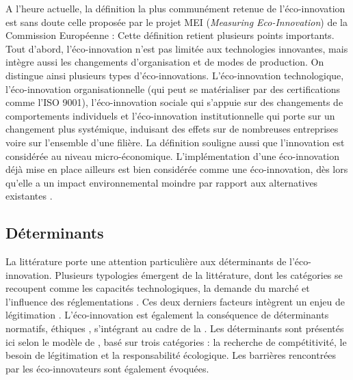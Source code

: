     A l'heure actuelle, la définition la plus communément retenue de l'éco-innovation est sans doute celle proposée par le projet MEI (\textit{Measuring Eco-Innovation}) de la Commission Européenne : \textit{} Cette définition retient plusieurs points importants. Tout d'abord, l'éco-innovation n'est pas limitée aux technologies innovantes, mais intègre aussi les changements d'organisation et de modes de production. On distingue ainsi plusieurs types d'éco-innovations. L'éco-innovation technologique, l'éco-innovation organisationnelle (qui peut se matérialiser par des certifications comme l'ISO 9001), l'éco-innovation sociale qui s'appuie sur des changements de comportements individuels et l'éco-innovation institutionnelle qui porte sur un changement plus systémique, induisant des effets sur de nombreuses entreprises voire sur l'ensemble d'une filière.  La définition souligne aussi que l'innovation est considérée au niveau micro-économique. L'implémentation d'une éco-innovation déjà mise en place ailleurs est bien considérée comme une éco-innovation, dès lors qu'elle a un impact environnemental moindre par rapport aux alternatives existantes \parencite{arundel2009measuring, kemp2010eco-innovation:}.


    \subsection{Déterminants}

        La littérature porte une attention particulière aux déterminants de l'éco-innovation. Plusieurs typologies émergent de la littérature, dont les catégories se recoupent comme les capacités technologiques, la demande du marché et l'influence des réglementations \parencite{rennings2000redefining, horbach2008determinants, triguero2013drivers}. Ces deux derniers facteurs intègrent un enjeu de légitimation \parencite{bansal2000why}. L'éco-innovation est également la conséquence de déterminants normatifs, éthiques \parencite{bansal2000why, mathieu2015les, reynaud2008les, paulraj2009environmental}, s'intégrant au cadre de la \rse. Les déterminants sont présentés ici selon le modèle de \textcite{bansal2000why}, basé sur trois catégories : la recherche de compétitivité, le besoin de légitimation et la responsabilité écologique. Les barrières rencontrées par les éco-innovateurs sont également évoquées.

